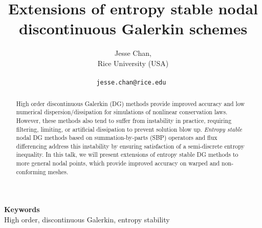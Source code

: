 \documentclass[a4paper]{article} %
\date{} %
\def\keywords#1{\begin{center}{\bf Keywords}\\{#1}\end{center}} %
\begin{document}
\title{Extensions of entropy stable nodal discontinuous Galerkin schemes}

\author{Jesse Chan, \\ %
       Rice University (USA) \\ \\ %
       \tt{jesse.chan@rice.edu} %
       }%


\maketitle

\thispagestyle{empty}


\begin{abstract}
High order discontinuous Galerkin (DG) methods provide improved accuracy and low numerical dispersion/dissipation for simulations of nonlinear conservation laws.  However, these methods also tend to suffer from instability in practice, requiring filtering, limiting, or artificial dissipation to prevent solution blow up.  \textit{Entropy stable} nodal DG methods based on summation-by-parts (SBP) operators and flux differencing address this instability by ensuring satisfaction of a semi-discrete entropy inequality.  In this talk, we will present extensions of entropy stable DG methods to more general nodal points, which provide improved accuracy on warped and non-conforming meshes.  
\end{abstract}

\keywords{High order, discontinuous Galerkin, entropy stability} %



\end{document}
